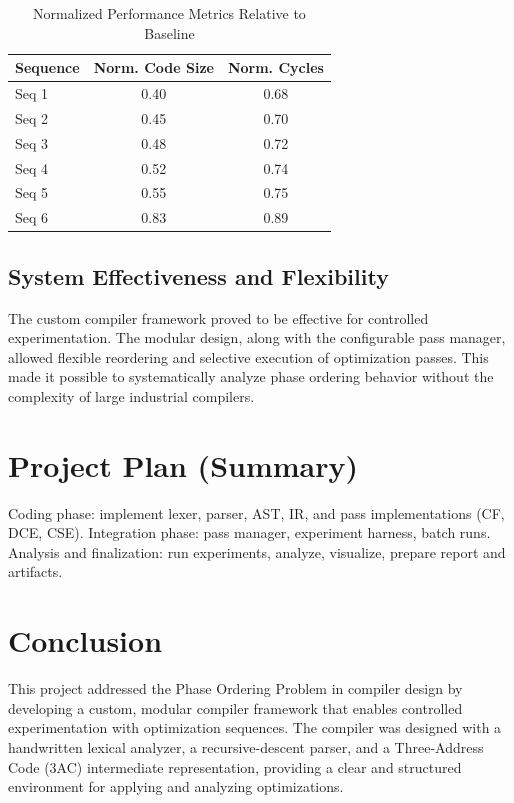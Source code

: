 \documentclass[conference]{IEEEtran}
\begin{document}
\begin{table}[!htbp]
\centering
\caption{Normalized Performance Metrics Relative to Baseline}
\label{tab:normalized_performance}
\renewcommand{\arraystretch}{1.2}
\begin{tabularx}{\columnwidth}{@{}Xcc@{}}
\toprule
\textbf{Sequence} & \textbf{Norm. Code Size} & \textbf{Norm. Cycles} \\
\midrule
Seq 1 & 0.40 & 0.68 \\
Seq 2 & 0.45 & 0.70 \\
Seq 3 & 0.48 & 0.72 \\
Seq 4 & 0.52 & 0.74 \\
Seq 5 & 0.55 & 0.75 \\
Seq 6 & 0.83 & 0.89 \\
\bottomrule
\end{tabularx}
\end{table}

\subsection{System Effectiveness and Flexibility}
The custom compiler framework proved to be effective for controlled experimentation. The modular design, along with the configurable pass manager, allowed flexible reordering and selective execution of optimization passes. This made it possible to systematically analyze phase ordering behavior without the complexity of large industrial compilers.

\section{Project Plan (Summary)}
Coding phase: implement lexer, parser, AST, IR, and pass implementations (CF, DCE, CSE). Integration phase: pass manager, experiment harness, batch runs. Analysis and finalization: run experiments, analyze, visualize, prepare report and artifacts.

\section{Conclusion}
This project addressed the Phase Ordering Problem in compiler design by developing a custom, modular compiler framework that enables controlled experimentation with optimization sequences. The compiler was designed with a handwritten lexical analyzer, a recursive-descent parser, and a Three-Address Code (3AC) intermediate representation, providing a clear and structured environment for applying and analyzing optimizations.
\end{document}
